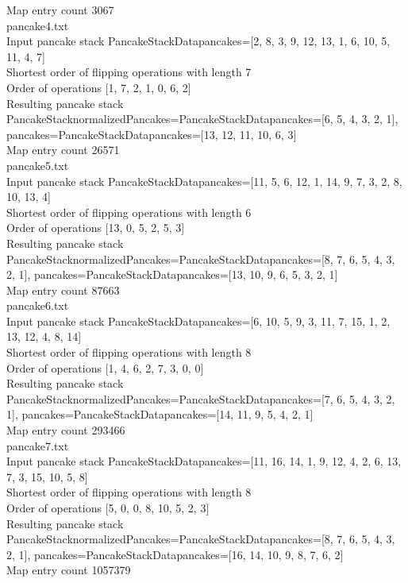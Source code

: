 Map entry count 3067 \\
pancake4.txt \\
Input pancake stack PancakeStackData{pancakes=[2, 8, 3, 9, 12, 13, 1, 6, 10, 5, 11, 4, 7]} \\
Shortest order of flipping operations with length 7 \\
Order of operations [1, 7, 2, 1, 0, 6, 2] \\
Resulting pancake stack PancakeStack{normalizedPancakes=PancakeStackData{pancakes=[6, 5, 4, 3, 2, 1]}, pancakes=PancakeStackData{pancakes=[13, 12, 11, 10, 6, 3]}} \\
Map entry count 26571 \\
pancake5.txt \\
Input pancake stack PancakeStackData{pancakes=[11, 5, 6, 12, 1, 14, 9, 7, 3, 2, 8, 10, 13, 4]} \\
Shortest order of flipping operations with length 6 \\
Order of operations [13, 0, 5, 2, 5, 3] \\
Resulting pancake stack PancakeStack{normalizedPancakes=PancakeStackData{pancakes=[8, 7, 6, 5, 4, 3, 2, 1]}, pancakes=PancakeStackData{pancakes=[13, 10, 9, 6, 5, 3, 2, 1]}} \\
Map entry count 87663 \\
pancake6.txt \\
Input pancake stack PancakeStackData{pancakes=[6, 10, 5, 9, 3, 11, 7, 15, 1, 2, 13, 12, 4, 8, 14]} \\
Shortest order of flipping operations with length 8 \\
Order of operations [1, 4, 6, 2, 7, 3, 0, 0] \\
Resulting pancake stack PancakeStack{normalizedPancakes=PancakeStackData{pancakes=[7, 6, 5, 4, 3, 2, 1]}, pancakes=PancakeStackData{pancakes=[14, 11, 9, 5, 4, 2, 1]}} \\
Map entry count 293466 \\
pancake7.txt \\
Input pancake stack PancakeStackData{pancakes=[11, 16, 14, 1, 9, 12, 4, 2, 6, 13, 7, 3, 15, 10, 5, 8]} \\
Shortest order of flipping operations with length 8 \\
Order of operations [5, 0, 0, 8, 10, 5, 2, 3] \\
Resulting pancake stack PancakeStack{normalizedPancakes=PancakeStackData{pancakes=[8, 7, 6, 5, 4, 3, 2, 1]}, pancakes=PancakeStackData{pancakes=[16, 14, 10, 9, 8, 7, 6, 2]}} \\
Map entry count 1057379 \\
